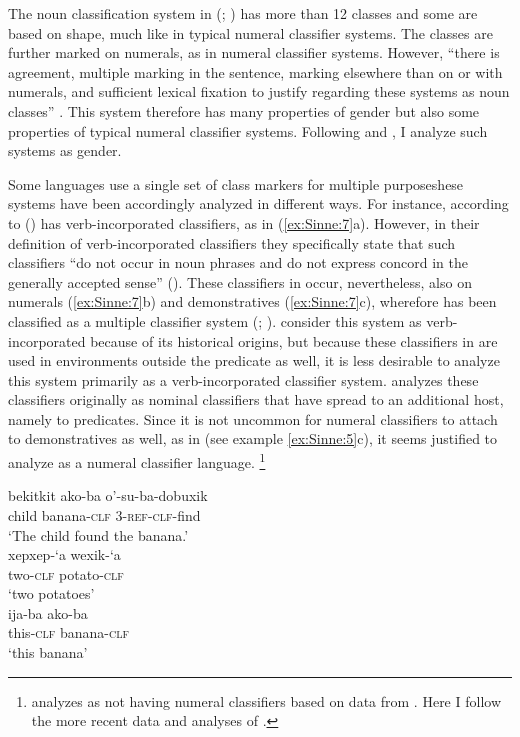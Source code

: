 \documentclass[output=collectionpaper]{langsci/langscibook}
\begin{document}
The noun classification system in  (; ) has more than 12 classes and some are based on shape, much like in typical numeral classifier systems. The classes are further marked on numerals, as in numeral classifier systems. However, ``there is agreement, multiple marking in the sentence, marking elsewhere than on or with numerals, and sufficient lexical fixation to justify regarding these systems as noun classes'' \citep[136]{Nichols1992}. This system therefore has many properties of gender but also some properties of typical numeral classifier systems. Following \citet{Nichols1992} and \citet{Corbett2013}, I analyze such systems as gender.

\largerpage
Some languages use a single set of class markers for multiple purposeshese systems have been accordingly analyzed in different ways. For instance, according to \citet[261]{Derbyshire1990}  () has verb\hyp{}incorporated classifiers, as in (\ref{ex:Sinne:7}a). However, in their definition of verb-incorporated classifiers they specifically state that such classifiers ``do not occur in noun phrases and do not express concord in the generally accepted sense'' (\citealt[245]{Derbyshire1990}). These classifiers in  occur, nevertheless, also on numerals (\ref{ex:Sinne:7}b) and demonstratives (\ref{ex:Sinne:7}c), wherefore  has been classified as a multiple classifier system (\citealt{Aikhenvald2000}; \citealt{Passer2016a}). \citet{Derbyshire1990} consider this system as verb-incorporated because of its historical origins, but because these classifiers in  are used in environments outside the predicate as well, it is less desirable to analyze this system primarily as a verb-incorporated classifier system. \citet{Passer2016a} analyzes these classifiers originally as nominal classifiers that have spread to an additional host, namely to predicates. Since it is not uncommon for numeral classifiers to attach to demonstratives as well, as in  (see example \ref{ex:Sinne:5}c), it seems justified to analyze  as a numeral classifier language.%
\footnote{\citet{Gil2013} analyzes  as not having numeral classifiers based on data from \citet{Derbyshire1990}. Here I follow the more recent data and analyses of \citet{Passer2016a}.}

\ea
\label{ex:Sinne:7}
\begin{xlist}
\ex
\gll bekitkit ako-ba o'-su-ba-dobuxik\\
child banana-\textsc{clf} \textsc{3-ref-clf}{}-find \\
\glt `The child found the banana.'\\
\ex
\gll xepxep-`a wexik-`a\\
two-\textsc{clf} potato-\textsc{clf} \\
\glt `two potatoes'\\
\ex
\gll ija-ba ako-ba\\
this-\textsc{clf} banana-\textsc{clf}\\
\glt `this banana'\\
\end{xlist}
\z
\end{document}
